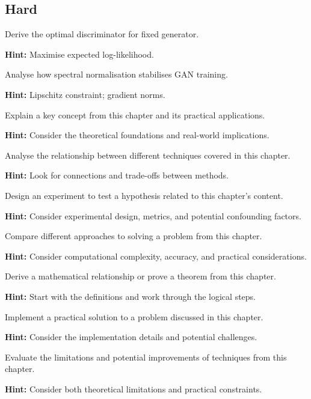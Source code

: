 \subsection*{Hard}

\begin{problem}
Derive the optimal discriminator for fixed generator.

\textbf{Hint:} Maximise expected log-likelihood.
\end{problem}

\begin{problem}
Analyse how spectral normalisation stabilises GAN training.

\textbf{Hint:} Lipschitz constraint; gradient norms.
\end{problem}


\begin{problem}
Explain a key concept from this chapter and its practical applications.

\textbf{Hint:} Consider the theoretical foundations and real-world implications.
\end{problem}

\begin{problem}
Analyse the relationship between different techniques covered in this chapter.

\textbf{Hint:} Look for connections and trade-offs between methods.
\end{problem}

\begin{problem}
Design an experiment to test a hypothesis related to this chapter's content.

\textbf{Hint:} Consider experimental design, metrics, and potential confounding factors.
\end{problem}

\begin{problem}
Compare different approaches to solving a problem from this chapter.

\textbf{Hint:} Consider computational complexity, accuracy, and practical considerations.
\end{problem}

\begin{problem}
Derive a mathematical relationship or prove a theorem from this chapter.

\textbf{Hint:} Start with the definitions and work through the logical steps.
\end{problem}

\begin{problem}
Implement a practical solution to a problem discussed in this chapter.

\textbf{Hint:} Consider the implementation details and potential challenges.
\end{problem}

\begin{problem}
Evaluate the limitations and potential improvements of techniques from this chapter.

\textbf{Hint:} Consider both theoretical limitations and practical constraints.
\end{problem}
